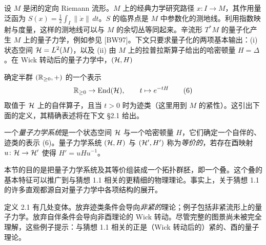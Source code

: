 
设 $M$ 是闭的定向 Riemann 流形。$M$ 上的经典力学研究路径 $x\colon I\to M$，其作用量泛函为 $S(x)=\frac{1}{2}\int_I\|\dot{x}\|\,dt$。$S$ 的临界点是 $M$ 中参数化的测地线。利用指数映射与度量，这样的测地线可以与 $M$ 的余切丛等同起来。辛流形 $T^{*}M$ 的量子化产生 $M$ 上的量子力学，例如参见 [BW97]。下文只要求量子化的两项基本输出：(i) 状态空间 $\mathcal{H}=L^{2}(M)$，以及 (ii) 由 $M$ 上的拉普拉斯算子给出的哈密顿量 $H=\Delta$。在 Wick 转动后的量子力学中，$(\mathcal{H},H)$

确定半群 $(\mathbb{R}_{\ge 0},+)$ 的一个表示
\begin{equation}
\mathbb{R}_{\ge 0}\to\mathrm{End}(\mathcal{H}),\qquad t\mapsto e^{-tH}
\tag{6}
\end{equation}
取值于 $\mathcal{H}$ 上的自伴算子，且当 $t>0$ 时为迹类（这里用到 $M$ 的紧性）。这引出下面的定义，其精确表述将在下文 §2.1 给出。

\begin{definition}[2.1]
一个\emph{量子力学系统}是一个状态空间 $\mathcal{H}$ 与一个哈密顿量 $H$，它们确定一个自伴的、迹类的表示 (6)。量子力学系统 $(\mathcal{H},H)$ 与 $(\mathcal{H}',H')$ 称为\emph{等价的}，若存在酉映射 $u\colon\mathcal{H}\to\mathcal{H}'$ 使得 $H'=uHu^{-1}$。
\end{definition}

本节的目的是把量子力学系统及其等价组装成一个拓扑群胚，即一个叠。这个叠的基本特征可以推广到与猜想 1.1 相关的更精细的物理理论。事实上，关于猜想 1.1 的许多直观都源自对量子力学中各项结构的展开。

\begin{remark}[2.2]
定义 2.1 有几处变体。放弃迹类条件会导向\emph{非紧的}理论；例子包括非紧流形上的量子力学。放弃自伴条件会导向非酉理论的 Wick 转动。尽管完整的图景尚未被完全理解，这些例子提示：与猜想 1.1 相关的正是（Wick 转动后的）紧的、酉的量子理论。
\end{remark}

